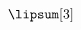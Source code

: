 \documentclass{article}
\begin{document}
\lipsum[1]

 \hfill$\vcenter{\hsize.6\linewidth\begin{minipage}{.6\linewidth}
    \lipsum[3]
\end{minipage}}$\hfill\mbox{}

\lipsum[2]

 
\end{document}
